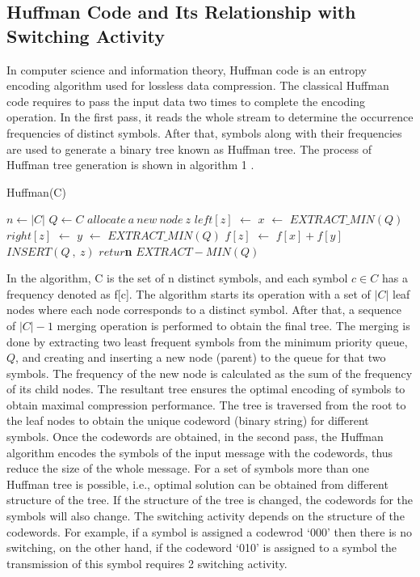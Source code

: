 \documentclass[preprint,12pt]{elsarticle}
\begin{document}
\subsection{Huffman Code and Its Relationship with Switching Activity}
In computer science and information theory, Huffman code is an entropy encoding algorithm used for lossless data compression. The classical Huffman code requires to pass the input data two times to complete the encoding operation. In the first pass, it reads the whole stream to determine the occurrence frequencies of distinct symbols. After that, symbols along with their frequencies are used to generate a binary tree known as Huffman tree. The process of Huffman tree generation is shown in algorithm 1 \cite{Cormen2001}.
 
\begin{algorithm}[!thpb]
\label{alg1}
\caption{Huffman(C)}
\begin{algorithmic}[1]
\State $n \leftarrow |C|$
\State $Q \leftarrow C$
\State $allocate~a~new~node~z$
\State $left[z]$ $\leftarrow$ $x$ $\leftarrow$ $EXTRACT\_MIN (Q)$
\State $right[z]$ $\leftarrow$ $y$ $\leftarrow$ $EXTRACT\_MIN (Q)$
\State $f[z]$ $\leftarrow$ $f[x] + f[y]$
\State $INSERT (Q~,~z)$
\ENDFOR
\State \textbf{$retur$n} $EXTRACT-MIN (Q)$
\end{algorithmic}
\end{algorithm}
In the algorithm, C is the set of n distinct symbols, and each symbol $ c\in C$ has a frequency denoted as f[c]. The algorithm starts its operation with a set of $|C|$  leaf nodes where each node corresponds to a distinct symbol. After that, a sequence of $|C|-1$ merging operation is performed to obtain the final tree. The merging is done by extracting two least frequent symbols from the minimum priority queue, $Q$, and creating and inserting a new node (parent) to the queue for that two symbols. The frequency of the new  node is calculated as the sum of the frequency of its child nodes.  The resultant tree ensures the optimal encoding of symbols to obtain maximal compression performance. The tree is traversed from the root to the leaf nodes to obtain the unique codeword (binary string) for different symbols. Once the codewords are obtained, in the second pass, the Huffman algorithm encodes the symbols of the input message with the codewords, thus reduce the size of the whole message.
For a set of symbols more than one Huffman tree is possible, i.e., optimal solution can be obtained from different structure of the tree. If the structure of the tree is changed, the codewords for the symbols will also change. The switching activity depends on the structure of the codewords. For example, if a symbol is assigned a codewrod `000' then there is no switching, on the other hand, if the codeword `010' is assigned to a symbol the transmission of this symbol requires 2 switching activity.
\end{document}

